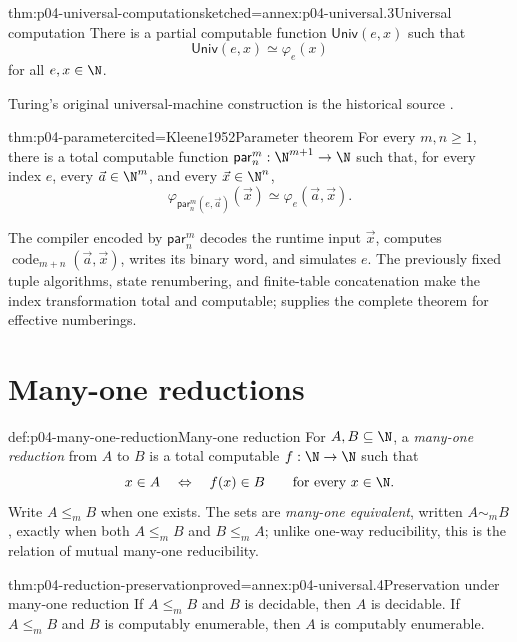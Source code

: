 \begin{hbtheorem}{thm:p04-universal-computation}{sketched=annex:p04-universal.3}{Universal computation}
There is a partial computable function \(\mathsf{Univ}(e,x)\) such that
\[
  \mathsf{Univ}(e,x)\simeq\varphi_e(x)
\]
for all \(e,x\in\N\).
\end{hbtheorem}

Turing's original universal-machine construction is the historical source
\cite{Turing1937}.

\begin{hbtheorem}{thm:p04-parameter}{cited=Kleene1952}{Parameter theorem}
For every \(m,n\ge1\), there is a total computable function
\(\mathsf{par}_n^m:\N^{m+1}\to\N\) such that, for every index \(e\), every
\(\vec a\in\N^m\), and every \(\vec x\in\N^n\),
\[
  \varphi_{\mathsf{par}_n^m(e,\vec a)}(\vec x)
  \simeq\varphi_e(\vec a,\vec x).
\]
\end{hbtheorem}

The compiler encoded by \(\mathsf{par}_n^m\) decodes the runtime input
\(\vec x\), computes \(\operatorname{code}_{m+n}(\vec a,\vec x)\), writes its
binary word, and simulates \(e\).  The previously fixed tuple algorithms,
state renumbering, and finite-table concatenation make the index transformation
total and computable; \cite{Kleene1952} supplies the complete theorem for
effective numberings.

\section{Many-one reductions}
\label{sec:p04-many-one}

\begin{hbdefinition}{def:p04-many-one-reduction}{Many-one reduction}
For \(A,B\subseteq\N\), a \emph{many-one reduction} from \(A\) to \(B\) is a
total computable \(f:\N\to\N\) such that
\[
  x\in A\quad\Leftrightarrow\quad f(x)\in B
  \qquad\text{for every }x\in\N.
\]
Write \(A\leq_m B\) when one exists.
The sets are \emph{many-one equivalent}, written \(A\sim_m B\), exactly when
both \(A\leq_m B\) and \(B\leq_m A\); unlike one-way reducibility, this is
the relation of mutual many-one reducibility.
\end{hbdefinition}

\begin{hblemma}{thm:p04-reduction-preservation}{proved=annex:p04-universal.4}{Preservation under many-one reduction}
If \(A\leq_m B\) and \(B\) is decidable, then \(A\) is decidable.  If
\(A\leq_m B\) and \(B\) is computably enumerable, then \(A\) is computably
enumerable.
\end{hblemma}


